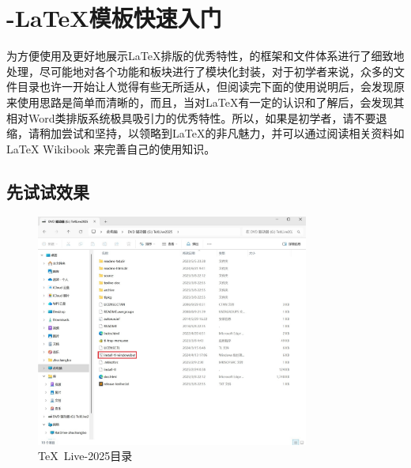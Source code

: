\chapter{\projectname-\LaTeX{}模板快速入门}\label{chap:latex-quickstart}

为方便使用及更好地展示\LaTeX{}排版的优秀特性，\projectname 的框架和文件体系进行了细致地处理，尽可能地对各个功能和板块进行了模块化封装，对于初学者来说，众多的文件目录也许一开始让人觉得有些无所适从，但阅读完下面的使用说明后，会发现原来使用思路是简单而清晰的，而且，当对\LaTeX{}有一定的认识和了解后，会发现其相对Word类排版系统极具吸引力的优秀特性。所以，如果是初学者，请不要退缩，请稍加尝试和坚持，以领略到\LaTeX{}的非凡魅力，并可以通过阅读相关资料如\LaTeX{} Wikibook \cite{wikibook2014latex} 来完善自己的使用知识。

\section{先试试效果}
\begin{figure}[!hptb]
        \centering
        \includegraphics[width=0.8\textwidth]{doc/figures/texlive-iso-content.jpg}
        \caption{\TeX~Live-2025目录}
        \label{fig:texlive-iso-content}
        \end{figure}
